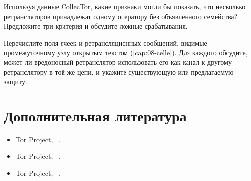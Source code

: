 \begin{esercizio}[2]\label{es:27-segnali}
Используя данные CollecTor, какие признаки могли бы показать, что несколько ретрансляторов принадлежат одному оператору без объявленного семейства? Предложите три критерия и обсудите ложные срабатывания.
\end{esercizio}

\begin{esercizio}[3]\label{es:27-canali}
Перечислите поля ячеек и ретрансляционных сообщений, видимые промежуточному узлу открытым текстом (\cref{cap:08-celle}). Для каждого обсудите, может ли вредоносный ретранслятор использовать его как канал к другому ретранслятору в той же цепи, и укажите существующую или предлагаемую защиту.
\end{esercizio}

\section*{Дополнительная литература}
\begin{itemize}
  \item Tor Project, ~\cite{torblog2014relayearly}.
  \item Tor Project, ~\cite{torblog2022badrelays}.
  \item Tor Project, ~\cite{torblog2023pow}.
\end{itemize}
